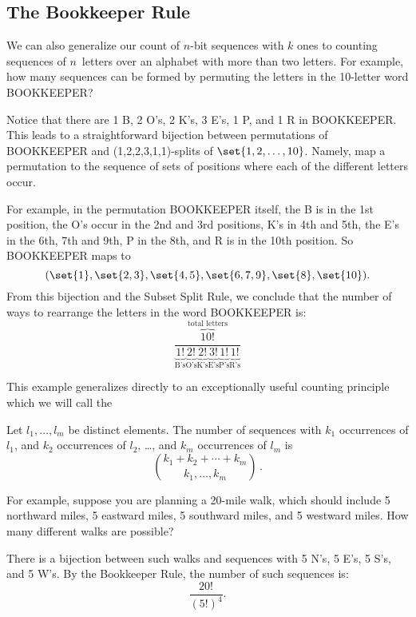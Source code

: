 \subsection{The Bookkeeper Rule}%

We can also generalize our count of $n$-bit sequences
with $k$ ones to counting sequences of $n$~letters over an alphabet
with more than two letters.  For example, how many sequences can be
formed by permuting the letters in the 10-letter word BOOKKEEPER?

Notice that there are 1 B, 2 O's, 2 K's, 3 E's, 1 P, and 1 R in
BOOKKEEPER.  This leads to a straightforward bijection between
permutations of BOOKKEEPER and (1,2,2,3,1,1)-splits of $\set{1, 2,
  \dots, 10}$.  Namely, map a permutation to the sequence of sets of
positions where each of the different letters occur.

For example, in the permutation BOOKKEEPER itself, the B is in the 1st
position, the O's occur in the 2nd and 3rd positions, K's in 4th and 5th,
the E's in the 6th, 7th and 9th, P in the 8th, and R is in the 10th
position. So BOOKKEEPER maps to
\[
(\set{1}, \set{2,3}, \set{4,5}, \set{6,7,9}, \set{8}, \set{10}).
\]
From this bijection and the Subset Split Rule, we conclude that the
number of ways to rearrange the letters in the word BOOKKEEPER is:
\[
\frac{\overbrace{10!}^{\text{total letters}}}{
\underbrace{1!}_{\text{B's}}
\underbrace{2!}_{\text{O's}}
\underbrace{2!}_{\text{K's}}
\underbrace{3!}_{\text{E's}}
\underbrace{1!}_{\text{P's}}
\underbrace{1!}_{\text{R's}}}
\]

This example generalizes directly to an exceptionally useful counting
principle which we will call the
\begin{rul}
Let $l_1, \ldots, l_m$ be distinct elements.  The number of sequences with
$k_1$ occurrences of $l_1$, and $k_2$ occurrences of $l_2$, \dots, and
$k_m$ occurrences of $l_m$ is
\[
\binom{k_1 + k_2 + \cdots + k_m}{k_1,\dots,k_m}\,.
\]
\end{rul}

For example, suppose you are planning a 20-mile walk, which should
include 5 northward miles, 5 eastward miles, 5 southward miles, and 5
westward miles.  How many different walks are possible?

There is a bijection between such walks and sequences with 5 N's, 5
E's, 5 S's, and 5 W's.  By the Bookkeeper Rule, the number of such
sequences is:
\[
    \frac{20!}{(5!)^4}.
\]

